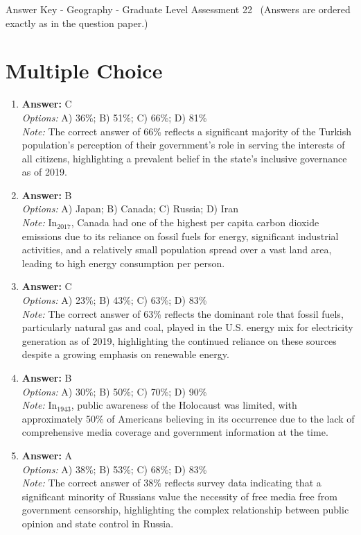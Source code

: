 \documentclass[12pt]{article}
\begin{document}
\begin{center}
Answer Key - Geography - Graduate Level Assessment 22 \
\small (Answers are ordered exactly as in the question paper.)
\end{center}

\section*{Multiple Choice}
\begin{enumerate}[label=\arabic*.]
\item \textbf{Answer:} C
\\ \textit{Options:} A) 36\%; B) 51\%; C) 66\%; D) 81\%
\\ \textit{Note:} The correct answer of 66\% reflects a significant majority of the Turkish population's perception of their government's role in serving the interests of all citizens, highlighting a prevalent belief in the state's inclusive governance as of 2019.
\item \textbf{Answer:} B
\\ \textit{Options:} A) Japan; B) Canada; C) Russia; D) Iran
\\ \textit{Note:} In$_{2017}$, Canada had one of the highest per capita carbon dioxide emissions due to its reliance on fossil fuels for energy, significant industrial activities, and a relatively small population spread over a vast land area, leading to high energy consumption per person.
\item \textbf{Answer:} C
\\ \textit{Options:} A) 23\%; B) 43\%; C) 63\%; D) 83\%
\\ \textit{Note:} The correct answer of 63\% reflects the dominant role that fossil fuels, particularly natural gas and coal, played in the U.S. energy mix for electricity generation as of 2019, highlighting the continued reliance on these sources despite a growing emphasis on renewable energy.
\item \textbf{Answer:} B
\\ \textit{Options:} A) 30\%; B) 50\%; C) 70\%; D) 90\%
\\ \textit{Note:} In$_{1943}$, public awareness of the Holocaust was limited, with approximately 50\% of Americans believing in its occurrence due to the lack of comprehensive media coverage and government information at the time.
\item \textbf{Answer:} A
\\ \textit{Options:} A) 38\%; B) 53\%; C) 68\%; D) 83\%
\\ \textit{Note:} The correct answer of 38\% reflects survey data indicating that a significant minority of Russians value the necessity of free media free from government censorship, highlighting the complex relationship between public opinion and state control in Russia.
\end{enumerate}
\end{document}
